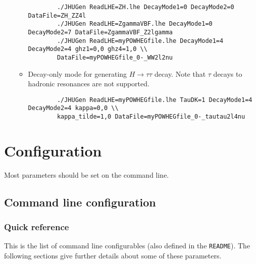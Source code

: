 \documentclass[aps,superscriptaddress,nofootinbib]{revtex4}
\begin{document}
\begin{itemize}
\begin{itemize}
\begin{verbatim}
		./JHUGen ReadLHE=ZH.lhe DecayMode1=0 DecayMode2=0 DataFile=ZH_ZZ4l
		./JHUGen ReadLHE=ZgammaVBF.lhe DecayMode1=0 DecayMode2=7 DataFile=ZgammaVBF_Z2lgamma
		./JHUGen ReadLHE=myPOWHEGfile.lhe DecayMode1=4 DecayMode2=4 ghz1=0,0 ghz4=1,0 \\
	    DataFile=myPOWHEGfile_0-_WW2l2nu
		\end{verbatim}
		\item Decay-only mode for generating $H\to\tau\tau$ decay.  Note that $\tau$ decays to hadronic resonances are not supported.
		\begin{verbatim}
		./JHUGen ReadLHE=myPOWHEGfile.lhe TauDK=1 DecayMode1=4 DecayMode2=4 kappa=0,0 \\
		kappa_tilde=1,0 DataFile=myPOWHEGfile_0-_tautau2l4nu
		\end{verbatim}
	\end{itemize}
\end{itemize}

\section{Configuration}

Most parameters should be set on the command line.

\subsection{Command line configuration}

\subsubsection{Quick reference}

This is the list of command line configurables (also defined in the \verb|README|).  The following sections give further details about some of these parameters.
\end{document}
